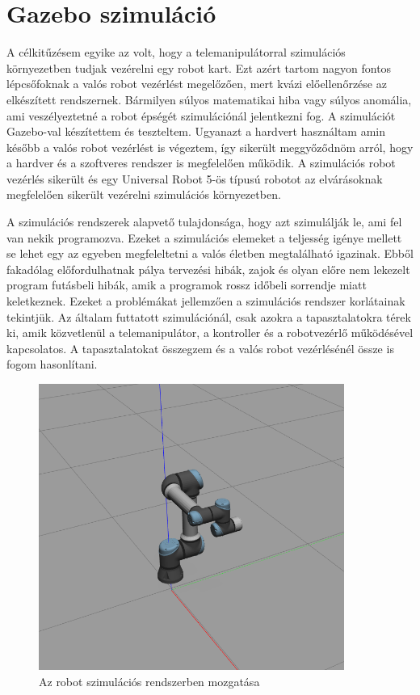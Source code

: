 \section{Gazebo szimuláció}

A célkitűzésem egyike az volt, hogy a telemanipulátorral szimulációs környezetben tudjak vezérelni egy robot kart. Ezt azért tartom nagyon fontos lépcsőfoknak a valós robot vezérlést megelőzően, mert kvázi előellenőrzése az elkészített rendszernek. Bármilyen súlyos matematikai hiba vagy súlyos anomália, ami veszélyeztetné a robot épségét szimulációnál jelentkezni fog. A szimulációt Gazebo-val készítettem és teszteltem. Ugyanazt a hardvert használtam amin később a valós robot vezérlést is végeztem, így sikerült meggyőződnöm arról, hogy a hardver és a szoftveres rendszer is megfelelően működik. A szimulációs robot vezérlés sikerült és egy Universal Robot 5-ös típusú robotot az elvárásoknak megfelelően sikerült vezérelni szimulációs környezetben.

A szimulációs rendszerek alapvető tulajdonsága, hogy azt szimulálják le, ami fel van nekik programozva. Ezeket a szimulációs elemeket a teljesség igénye mellett se lehet egy az egyeben megfeleltetni a valós életben megtalálható igazinak. Ebből fakadólag előfordulhatnak pálya tervezési hibák, zajok és olyan előre nem lekezelt program futásbeli hibák, amik a programok rossz időbeli sorrendje miatt keletkeznek. Ezeket a problémákat jellemzően a szimulációs rendszer korlátainak tekintjük. Az általam futtatott szimulációnál, csak azokra a tapasztalatokra térek ki, amik közvetlenül a telemanipulátor, a kontroller és a robotvezérlő működésével kapcsolatos. A tapasztalatokat összegzem és a valós robot vezérlésénél össze is fogom hasonlítani.

\begin{figure}[!ht]
\centering
\includegraphics[width=100mm, keepaspectratio]{figures/Robot/szimu}
\caption{Az robot szimulációs rendszerben mozgatása}
\label{fig:szimu_robot_mozgatas}
\end{figure}

